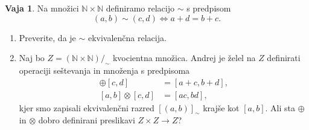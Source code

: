 \documentclass{article}
\newcommand{\NN}{\mathbb{N}}
\theoremstyle{definition}
\newtheorem{vaja}{Vaja}
\begin{document}
\begin{vaja}
  Na množici $\NN \times \NN$ definiramo relacijo $\sim$ s predpisom
  \begin{equation*}
    (a,b) \sim (c,d) \iff a + d = b + c.
  \end{equation*}
  \begin{enumerate}
    \item
      Preverite, da je $\sim$ ekvivalenčna relacija.
    \item
      Naj bo $Z = (\NN \times \NN)/_\sim$ kvocientna množica. Andrej je želel na $Z$ definirati operaciji seštevanja in množenja s predpisoma
      \begin{align*}
        [a,b] \oplus [c,d] &= [a+c, b+d],\\
        [a,b] \otimes [c,d] &= [a c, b d],
      \end{align*}
      kjer smo zapisali ekvivalenčni razred $[(a,b)]_\sim$ krajše kot $[a,b]$. Ali sta $\oplus$ in $\otimes$ dobro definirani preslikavi $Z \times Z \to Z$? 
  \end{enumerate}
\end{vaja}
\end{document}
